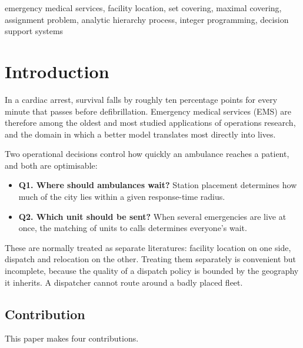 \documentclass[conference]{IEEEtran}
\begin{document}
\begin{IEEEkeywords}
emergency medical services, facility location, set covering, maximal covering,
assignment problem, analytic hierarchy process, integer programming,
decision support systems
\end{IEEEkeywords}

\section{Introduction}

In a cardiac arrest, survival falls by roughly ten percentage
points for every minute that passes before defibrillation. Emergency medical
services (EMS) are therefore among the oldest and most studied applications of
operations research, and the domain in which a better model translates most
directly into lives.

Two operational decisions control how quickly an ambulance reaches a patient,
and both are optimisable:

\begin{itemize}
  \item \textbf{Q1. Where should ambulances wait?} Station placement
    determines how much of the city lies within a given response-time radius.
  \item \textbf{Q2. Which unit should be sent?} When several emergencies are
    live at once, the matching of units to calls determines everyone's wait.
\end{itemize}

These are normally treated as separate literatures: facility location on one
side, dispatch and relocation on the other. Treating them separately is
convenient but incomplete, because the quality of a dispatch policy is bounded
by the geography it inherits. A dispatcher cannot route around a badly placed
fleet.

\subsection{Contribution}

This paper makes four contributions.
\end{document}
